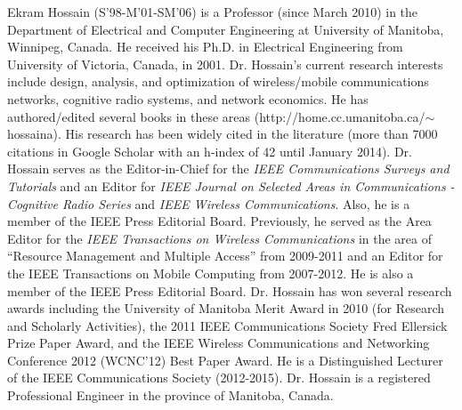 \documentclass[twocolumn,10pt]{IEEEtran}
\begin{document}
\begin{IEEEbiography} 
{Ekram Hossain} (S'98-M'01-SM'06)  
is a Professor (since March 2010) in the Department of Electrical and Computer Engineering at University of Manitoba, Winnipeg, Canada. He received his Ph.D. in Electrical Engineering from University of Victoria, Canada, in 2001. Dr. Hossain's current research interests include design, analysis, and optimization of wireless/mobile communications networks, cognitive radio systems, and network economics.  He has authored/edited several books in these areas (http://home.cc.umanitoba.ca/$\sim$hossaina). His research has been widely cited in the literature (more than 7000 citations in
Google Scholar with an h-index of 42 until January 2014). Dr. Hossain  serves as the Editor-in-Chief for the {\em IEEE Communications Surveys and Tutorials}  and an Editor for {\em IEEE Journal on Selected Areas in Communications - Cognitive Radio Series} and {\em IEEE Wireless Communications}.  Also, he is a member of the IEEE Press Editorial Board. Previously, he served as the Area Editor for the {\em IEEE Transactions on Wireless Communications} in the area of  ``Resource Management and Multiple Access'' from 2009-2011 and an Editor for the IEEE Transactions on Mobile Computing from 2007-2012. He is also a member of the IEEE Press Editorial Board. Dr. Hossain has won several research awards including the University of Manitoba Merit Award in 2010 (for Research and Scholarly Activities), the 2011 IEEE Communications Society Fred Ellersick Prize Paper Award, and the IEEE Wireless Communications and Networking Conference 2012 (WCNC'12) Best Paper Award. He is a Distinguished Lecturer of the IEEE Communications Society (2012-2015). Dr. Hossain is a registered Professional Engineer in the province of Manitoba, Canada. 
\end{IEEEbiography}
\end{document}
